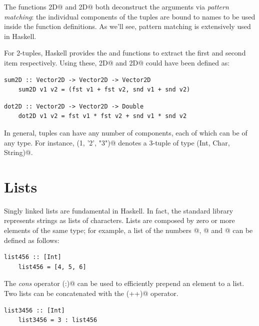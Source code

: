 \documentclass[UdineBachThesis,american,11pt,draft]{PhdThesis}
\begin{document}
  The functions \lstinline@sum2D@ and \lstinline@dot2D@ both deconstruct the
  arguments via \emph{pattern matching}: the individual components of the tuples
  are bound to names to be used inside the function definitions. As we'll see,
  pattern matching is extensively used in Haskell.

  For 2-tuples, Haskell provides the \lstinline@fst@ and \lstinline@snd@
  functions to extract the first and second item respectively. Using these,
  \lstinline@sum2D@ and \lstinline@dot2D@ could have been defined as:

  \begin{lstlisting}[gobble=4,basicstyle=\ttfamily\small]
    sum2D :: Vector2D -> Vector2D -> Vector2D
    sum2D v1 v2 = (fst v1 + fst v2, snd v1 + snd v2)
  \end{lstlisting}

  \begin{lstlisting}[gobble=4,basicstyle=\ttfamily\small]
    dot2D :: Vector2D -> Vector2D -> Double
    dot2D v1 v2 = fst v1 * fst v2 + snd v1 * snd v2
  \end{lstlisting}

  In general, tuples can have any number of components, each of which can be of
  any type. For instance, \lstinline@(1, '2', "3")@ denotes a 3-tuple of type
  \lstinline@(Int, Char, String)@.

  \section{Lists}

  Singly linked lists are fundamental in Haskell. In fact, the standard library
  represents strings as lists of characters. Lists are composed by zero or more
  elements of the same type; for example, a list of the numbers @,
  @ and @ can be defined as follows:

  \begin{lstlisting}[gobble=4,basicstyle=\ttfamily\small]
    list456 :: [Int]
    list456 = [4, 5, 6]
  \end{lstlisting}

  The \emph{cons} operator \lstinline@(:)@ can be used to efficiently prepend an
  element to a list. Two lists can be concatenated with the \lstinline@(++)@
  operator.

  \begin{lstlisting}[gobble=4,basicstyle=\ttfamily\small]
    list3456 :: [Int]
    list3456 = 3 : list456
  \end{lstlisting}
\end{document}
